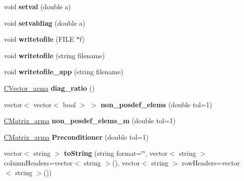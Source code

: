 \begin{DoxyCompactItemize}
void {\bfseries setval} (double a)
\item 
\mbox{\label{class_c_matrix__arma_a8f4520203deebf2c0957918517a60fac}} 
void {\bfseries setvaldiag} (double a)
\item 
\mbox{\label{class_c_matrix__arma_ac02cd1e3b5e7790e98074ee7afe2bf45}} 
void {\bfseries writetofile} (F\+I\+LE $\ast$f)
\item 
\mbox{\label{class_c_matrix__arma_a84f2e8e68a5be3ff397a4b53d1d44a68}} 
void {\bfseries writetofile} (string filename)
\item 
\mbox{\label{class_c_matrix__arma_af772b8267f320754799fea9abec88140}} 
void {\bfseries writetofile\+\_\+app} (string filename)
\item 
\mbox{\label{class_c_matrix__arma_a9c015c21209b5a0ca7ba52287665006b}} 
\hyperlink{class_c_vector__arma}{C\+Vector\+\_\+arma} {\bfseries diag\+\_\+ratio} ()
\item 
\mbox{\label{class_c_matrix__arma_a12f740819d75757014b1d982933f93db}} 
vector$<$ vector$<$ bool $>$ $>$ {\bfseries non\+\_\+posdef\+\_\+elems} (double tol=1)
\item 
\mbox{\label{class_c_matrix__arma_a4ae3db7d9383ebe5f70bd331f7593792}} 
\hyperlink{class_c_matrix__arma}{C\+Matrix\+\_\+arma} {\bfseries non\+\_\+posdef\+\_\+elems\+\_\+m} (double tol=1)
\item 
\mbox{\label{class_c_matrix__arma_a7adb58eb658ee661492c7678f084178d}} 
\hyperlink{class_c_matrix__arma}{C\+Matrix\+\_\+arma} {\bfseries Preconditioner} (double tol=1)
\item 
\mbox{\label{class_c_matrix__arma_a6c130c85fe294252bd39a5417996236d}} 
vector$<$ string $>$ {\bfseries to\+String} (string format=\char`\"{}\char`\"{}, vector$<$ string $>$ column\+Headers=vector$<$ string $>$(), vector$<$ string $>$ row\+Headers=vector$<$ string $>$())
\item 
\mbox{\label{class_c_matrix__arma_a78ef04937e9bca7005cff82e9f4e9a53}} 

\end{DoxyCompactItemize}
